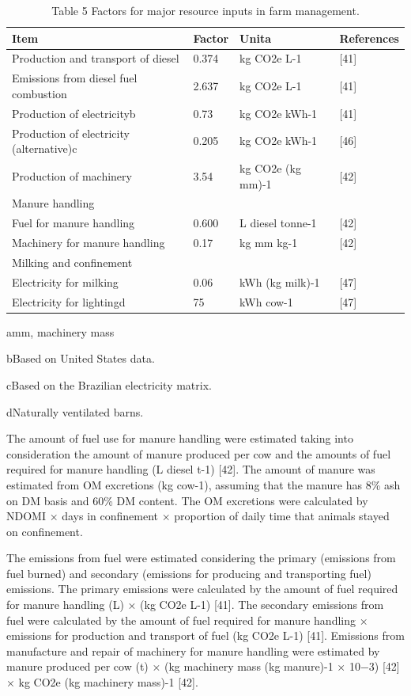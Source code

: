 \documentclass[11pt,a4paper]{article}
\begin{document}
\begin{table}[h]
\caption{Table 5 Factors for major resource inputs in farm management.}
\begin{tabular}{|l|l|l|l|}
\hline
Item & Factor & Unita & References \\ \hline
Production and transport of diesel & 0.374 & kg CO2e L-1 & [41] \\ \hline
Emissions from diesel fuel combustion & 2.637 & kg CO2e L-1 & [41] \\ \hline
Production of electricityb & 0.73 & kg CO2e kWh-1 & [41] \\ \hline
Production of electricity (alternative)c & 0.205 & kg CO2e kWh-1 & [46] \\ \hline
Production of machinery & 3.54 & kg CO2e (kg mm)-1 & [42] \\ \hline
Manure handling &  &  &  \\ \hline
Fuel for manure handling & 0.600 & L diesel tonne-1 & [42] \\ \hline
Machinery for manure handling & 0.17 & kg mm kg-1 & [42] \\ \hline
Milking and confinement &  &  &  \\ \hline
Electricity for milking & 0.06 & kWh (kg milk)-1 & [47] \\ \hline
Electricity for lightingd & 75 & kWh cow-1 & [47] \\ \hline
\end{tabular}
\end{table}

amm, machinery mass

bBased on United States data.

cBased on the Brazilian electricity matrix.

dNaturally ventilated barns.

The amount of fuel use for manure handling were estimated taking into consideration the amount of manure produced per cow and the amounts of fuel required for manure handling (L diesel t-1) [42]. The amount of manure was estimated from OM excretions (kg cow-1), assuming that the manure has 8\% ash on DM basis and 60\% DM content. The OM excretions were calculated by NDOMI × days in confinement × proportion of daily time that animals stayed on confinement.

The emissions from fuel were estimated considering the primary (emissions from fuel burned) and secondary (emissions for producing and transporting fuel) emissions. The primary emissions were calculated by the amount of fuel required for manure handling (L) × (kg CO2e L-1) [41]. The secondary emissions from fuel were calculated by the amount of fuel required for manure handling × emissions for production and transport of fuel (kg CO2e L-1) [41]. Emissions from manufacture and repair of machinery for manure handling were estimated by manure produced per cow (t) × (kg machinery mass (kg manure)-1 × 10−3) [42] × kg CO2e (kg machinery mass)-1 [42].
\end{document}
